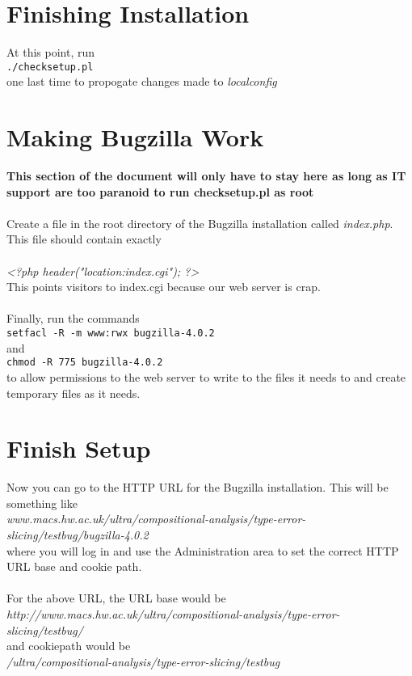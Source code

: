 \documentclass[11pt, a4paper]{report}%
\begin{document}
\section{Finishing Installation}
\label{sec:fininstall}
At this point, run\\
{\tt ./checksetup.pl}\\
one last time to propogate changes made to \emph{localconfig}


\section{Making Bugzilla Work}
\label{sec:makework}
{\bf This section of the document will only have to stay here as long as IT support are too paranoid to run checksetup.pl as root}
\\
\\
Create a file in the root directory of the Bugzilla installation called \emph{index.php}. This file should contain exactly\\
\\
\emph{\textless?php header("location:index.cgi"); ?\textgreater}\\

This points visitors to index.cgi because our web server is crap.\\
\\
Finally, run the commands\\
{\tt setfacl -R -m www:rwx bugzilla-4.0.2}\\
and\\
{\tt chmod -R 775 bugzilla-4.0.2}\\
to allow permissions to the web server to write to the files it needs to and create temporary files as it needs.


\section{Finish Setup}
\label{sec:finsetup}
Now you can go to the HTTP URL for the Bugzilla installation. This will be something like\\
\emph{www.macs.hw.ac.uk/ultra/compositional-analysis/type-error-slicing/testbug/bugzilla-4.0.2}\\
where you will log in and use the Administration area to set the correct HTTP URL base and cookie path.\\
\\
For the above URL, the URL base would be\\
\emph{http://www.macs.hw.ac.uk/ultra/compositional-analysis/type-error-slicing/testbug/}\\
and cookiepath would be\\
\emph{/ultra/compositional-analysis/type-error-slicing/testbug}
\end{document}
